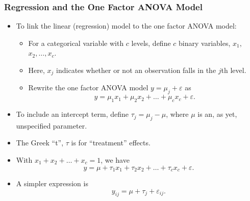     \begin{frame}%
 \frametitle{Regression and the One Factor ANOVA Model}
   \begin{itemize}
    \item To link the linear (regression) model to the one factor
    ANOVA model:
 \begin{itemize}
    \item For a categorical variable with $c$ levels, define $c$
binary variables, $x_{1},$ $x_{2},\ldots ,x_{c}$.
\item Here,
$x_{j}$ indicates whether or not an observation falls in the $j$th
level. \item Rewrite the one factor ANOVA model $ y=\mu _{j}+
\varepsilon$ as
\begin{equation*}
y=\mu _{1}x_{1}+\mu _{2}x_{2}+\ldots +\mu _{c}x_{c}+\varepsilon.
\end{equation*}

         \end{itemize}
\item To include an intercept term, define $\tau _{j}=\mu _{j}-\mu $,
where $\mu $ is an, as yet, unspecified parameter.
\item The Greek ``t'', $\tau$ is for ``treatment'' effects.
\item With
$x_{1}+x_{2}+\ldots +x_{c}=1$, we have
\begin{equation*}
y=\mu +\tau _{1}x_{1}+\tau _{2}x_{2}+\ldots +\tau
_{c}x_{c}+\varepsilon.
\end{equation*}
\item A simpler expression is
\begin{equation*}
y_{ij}=\mu +\tau_{j} + \varepsilon_{ij}.
\end{equation*}
         \end{itemize}

    \end{frame}


